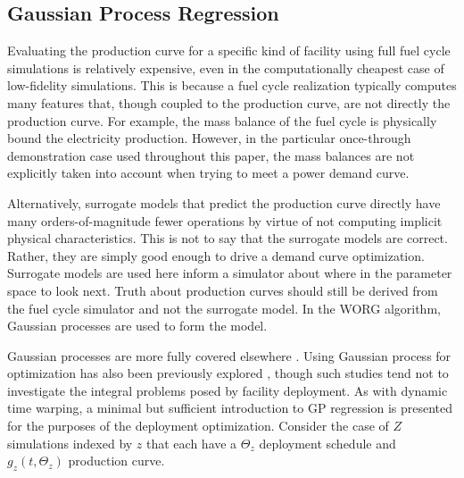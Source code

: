 \subsection{Gaussian Process Regression}
\label{gp}

Evaluating the production curve for a specific kind of facility using
full fuel cycle simulations is relatively expensive, even in the
computationally cheapest case of low-fidelity simulations. This is because a
fuel cycle realization
typically computes many features that, though coupled to the production
curve, are not directly the production curve. For example, the mass balance of
the fuel cycle is physically bound the electricity production. However,
in the particular once-through demonstration case used throughout this paper,
the mass balances are not explicitly taken into account when trying to meet
a power demand curve.

Alternatively, surrogate models that predict the production curve directly
have many orders-of-magnitude fewer operations by virtue of not computing
implicit physical characteristics. This is not to say that the surrogate
models are correct.  Rather, they are simply good enough to drive a demand
curve
optimization. Surrogate models are used here inform a simulator about where
in the parameter space to look next. Truth about production curves should
still be derived from the fuel cycle simulator and not the surrogate model.
In the WORG algorithm, Gaussian processes are used to form the model.

Gaussian processes are more fully covered elsewhere
\cite{rasmussen2006gaussian}. Using Gaussian process for optimization has
also been previously explored \cite{osborne2009gaussian}, though such studies
tend not to
investigate the integral problems posed by facility deployment. As with
dynamic time warping, a minimal but sufficient introduction to GP regression
is presented
for the purposes of the deployment optimization.
Consider the case of $Z$ simulations indexed by $z$ that each have a
$\Theta_z$ deployment schedule and $g_z(t, \Theta_z)$ production curve.

